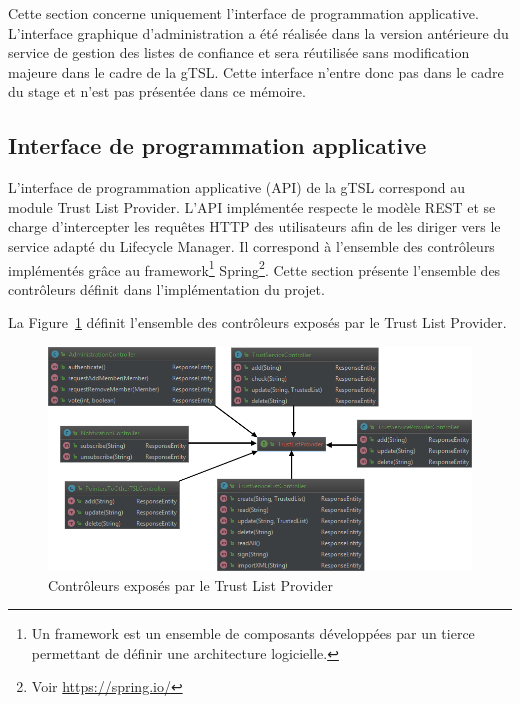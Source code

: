 \documentclass{tnreport}
\begin{document}
Cette section concerne uniquement l'interface de programmation applicative. L'interface graphique d'administration a été réalisée dans la version antérieure du service de gestion des listes de confiance et sera réutilisée sans modification majeure dans le cadre de la gTSL. Cette interface n'entre donc pas dans le cadre du stage et n'est pas présentée dans ce mémoire.

\subsection{Interface de programmation applicative}

L'interface de programmation applicative (API) de la gTSL correspond au module Trust List Provider. L'API implémentée respecte le modèle REST et se charge d'intercepter les requêtes HTTP des utilisateurs afin de les diriger vers le service adapté du Lifecycle Manager. Il correspond à l'ensemble des contrôleurs implémentés grâce au framework\footnote{Un framework est un ensemble de composants développées par un tierce permettant de définir une architecture logicielle.} Spring\footnote{Voir \url{https://spring.io/}}. Cette section présente l'ensemble des contrôleurs définit dans l'implémentation du projet.

La Figure~\ref{fig:rest-controllers} définit l'ensemble des contrôleurs exposés par le Trust List Provider.

\clearpage
\begin{figure}[h]
	\centering
	\includegraphics[scale=0.73]{figures/rest-controllers}
	\caption{Contrôleurs exposés par le Trust List Provider}
	\label{fig:rest-controllers}
\end{figure}
\end{document}

